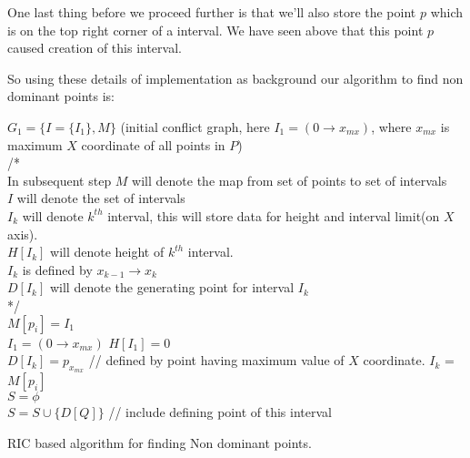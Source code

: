 \documentclass[a4paper]{article}
\begin{document}
One last thing before we proceed further is that we'll also store the point $p$ which is on the top right corner of a interval. We have seen above that this point $p$ caused creation of this interval.

\pagebreak

So using these details of implementation as background our algorithm to find non dominant points is:

\begin{algorithm}[H]
\SetAlgoLined
{}
  $G_1 = \{ I = \{ I_1 \}, M \}$ (initial conflict graph, here $I_1 = (0\rightarrow x_{mx})$, where $x_{mx}$ is maximum $X$ coordinate of all points in $P$) \\
  /* \\
  In subsequent step $M$ will denote the map from set of points to set of intervals \\
  $I$ will denote the set of intervals \\
  $I_k$ will denote $k^{th}$ interval, this will store data for height and interval limit(on $X$ axis).\\
  $H[I_k]$ will denote height of $k^{th}$ interval.\\
  $I_k$ is defined by $x_{k-1} \rightarrow x_k$\\
  $D[I_k]$ will denote the generating point for interval $I_k$ \\
  */ \\
   {
  	$M[p_i] = I_1$\\
  }
  $I_1 = (0\rightarrow x_{mx})$
  $H[I_1] = 0$\\
  $D[I_k] = p_{x_{mx}}$ // defined by point having maximum value of $X$ coordinate.
  {
 	$I_k$ = $M[p_i]$ \\
 }
 $S = \phi$ \\
  {
 	$S = S \cup \{ D[Q] \}$ // include defining point of this interval
 }

 \caption{RIC based algorithm for finding Non dominant points.}
\end{algorithm}
\end{document}
